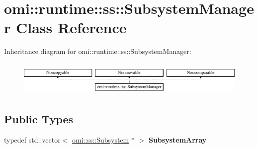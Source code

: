 \hypertarget{classomi_1_1runtime_1_1ss_1_1_subsystem_manager}{}\section{omi\+:\+:runtime\+:\+:ss\+:\+:Subsystem\+Manager Class Reference}
\label{classomi_1_1runtime_1_1ss_1_1_subsystem_manager}
Inheritance diagram for omi\+:\+:runtime\+:\+:ss\+:\+:Subsystem\+Manager\+:\begin{figure}[H]
\begin{center}
\leavevmode
\includegraphics[height=1.689291cm]{classomi_1_1runtime_1_1ss_1_1_subsystem_manager}
\end{center}
\end{figure}
\subsection*{Public Types}
\begin{DoxyCompactItemize}
\item 
typedef std\+::vector$<$ \hyperlink{classomi_1_1ss_1_1_subsystem}{omi\+::ss\+::\+Subsystem} $\ast$ $>$ {\bfseries Subsystem\+Array}\hypertarget{classomi_1_1runtime_1_1ss_1_1_subsystem_manager_a226d578e87476b9b7ab9579d96fd9247}{}\label{classomi_1_1runtime_1_1ss_1_1_subsystem_manager_a226d578e87476b9b7ab9579d96fd9247}

\end{DoxyCompactItemize}
